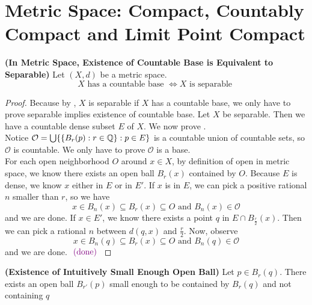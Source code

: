 \documentclass{report}
\begin{document}
\section{Metric Space: Compact, Countably Compact and Limit Point Compact}
\begin{theorem}
\label{2.7.1}
\textbf{(In Metric Space, Existence of Countable Base is Equivalent to Separable)} Let $(X,d)$ be a metric space. 
\begin{equation}
X\text{ has a countable base }\iff  X\text{ is separable }
\end{equation}
\end{theorem}
\begin{proof}
Because by , $X$ is separable if  $X$ has a countable base, we only have to prove separable implies existence of countable base. Let $X$ be separable. Then we have a countable dense subset $E$ of $X$. We now prove
.\\

Notice $\mathcal{O}=\bigcup \{ \{ B_r(p):r\in\mathbb{Q} \}:p\in E \}$ is a countable union of countable sets, so $\mathcal{O}$ is countable. We only have to prove $\mathcal{O}$ is a base.\\

For each open neighborhood $O$ around  $x\in X$, by definition of open in metric space, we know there exists an open ball $B_r(x)$ contained by $O$. Because $E$ is dense, we know  $x$ either in $E$ or in  $E'$. If $x$ is in  $E$, we can pick a positive rational  $n$ smaller than  $r$, so we have  
\begin{equation}
x\in B_n(x)\subseteq B_r(x)\subseteq O\text{ and }B_n(x)\in \mathcal{O} 
\end{equation}
and we are done. If $x\in E'$, we know there exists a point $q$ in  $E\cap B_{\frac{r}{2}}(x)$. Then we can pick a rational $n$ between $d(q,x)$ and $\frac{r}{2}$. Now, observe
\begin{equation}
x\in B_n(q)\subseteq B_r(x)\subseteq O\text{ and }B_n(q)\in \mathcal{O}
\end{equation}
and we are done. $\textcolor{violet}{\text{ (done) }}$
\end{proof}
\begin{lemma}
\label{2.7.2}
\textbf{(Existence of Intuitively Small Enough Open Ball)} Let $p\in  B_r(q)$. There exists an open ball $B_{r'}(p)$ small enough to be contained by $B_r(q)$ and not containing $q$ 
\end{lemma}
\end{document}
